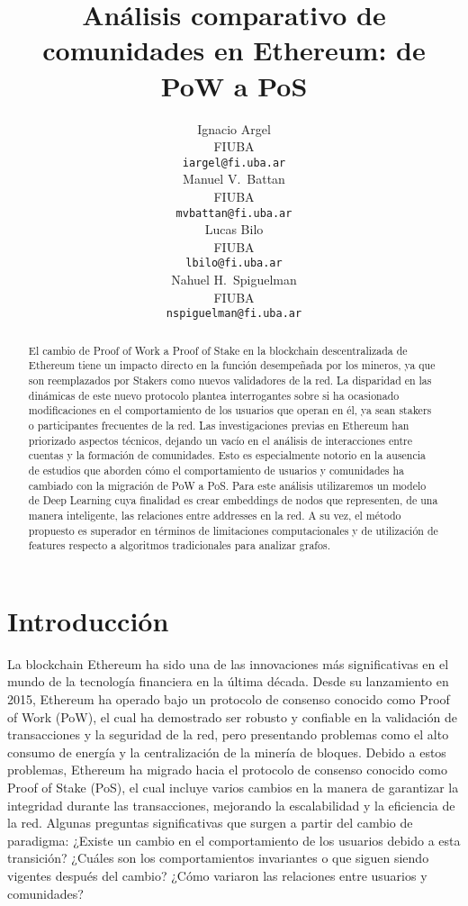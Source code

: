 \documentclass{article}
\title{Análisis comparativo de comunidades en Ethereum: de PoW a PoS}
\author{{
	\hspace{1mm}Ignacio Argel} \\
	FIUBA\\
	\texttt{iargel@fi.uba.ar} \\
	\And
	{\hspace{1mm}Manuel V.~Battan} \\
	FIUBA\\
	\texttt{mvbattan@fi.uba.ar} \\
	\AND
	{\hspace{1mm}Lucas Bilo} \\
	FIUBA\\
	\texttt{lbilo@fi.uba.ar} \\
	\And
	{\hspace{1mm}Nahuel H.~Spiguelman} \\
	FIUBA\\
	\texttt{nspiguelman@fi.uba.ar} \\
}
\begin{document}
\maketitle

\begin{abstract}
    El cambio de Proof of Work a Proof of Stake en la blockchain descentralizada de Ethereum tiene un impacto directo en la función desempeñada por los mineros, ya que son reemplazados por Stakers como nuevos validadores de la red. La disparidad en las dinámicas de este nuevo protocolo plantea interrogantes sobre si ha ocasionado modificaciones en el comportamiento de los usuarios que operan en él, ya sean stakers o participantes frecuentes de la red.
    Las investigaciones previas en Ethereum han priorizado aspectos técnicos, dejando un vacío en el análisis de interacciones entre cuentas y la formación de comunidades. Esto es especialmente notorio en la ausencia de estudios que aborden cómo el comportamiento de usuarios y comunidades ha cambiado con la migración de PoW a PoS.
    Para este análisis utilizaremos un modelo de Deep Learning cuya finalidad es crear embeddings de nodos que representen, de una manera inteligente, las relaciones entre addresses en la red. A su vez, el método propuesto es superador en términos de limitaciones computacionales y de utilización de features respecto a algoritmos tradicionales para analizar grafos.

\end{abstract}
\clearpage

\section{Introducción}

La blockchain Ethereum ha sido una de las innovaciones más significativas en el mundo de la tecnología financiera en la última década. Desde su lanzamiento en 2015, Ethereum ha operado bajo un protocolo de consenso conocido como Proof of Work (PoW), el cual ha demostrado ser robusto y confiable en la validación de transacciones y la seguridad de la red, pero presentando problemas como el alto consumo de energía y la centralización de la minería de bloques. Debido a estos problemas, Ethereum ha migrado hacia el protocolo de consenso conocido como Proof of Stake (PoS), el cual incluye varios cambios en la manera de garantizar la integridad durante las transacciones, mejorando la escalabilidad y la eficiencia de la red.
Algunas preguntas significativas que surgen a partir del cambio de paradigma: ¿Existe un cambio en el comportamiento de los usuarios debido a esta transición? ¿Cuáles son los comportamientos invariantes o que siguen siendo vigentes después del cambio? ¿Cómo variaron las relaciones entre usuarios y comunidades?
\end{document}
